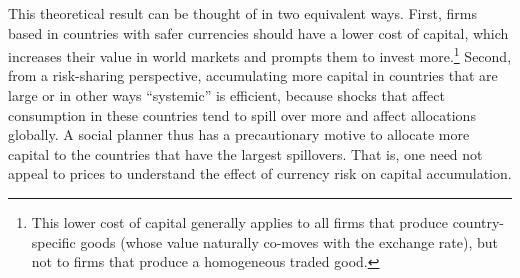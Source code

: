 \documentclass{ar-1col}
\begin{document}
This theoretical result can be thought of in two equivalent ways. First, firms based in countries with safer currencies should have a lower cost of capital, which increases their value in world markets and prompts them to invest more.\footnote{This lower cost of capital generally applies to all firms that produce country-specific goods (whose value naturally co-moves with the exchange rate), but not to firms that produce a homogeneous traded good.} Second, from a risk-sharing perspective, accumulating more capital in countries that are large or in other ways ``systemic'' is efficient, because shocks that affect consumption in these countries tend to spill over more and affect allocations globally. A social planner thus has a precautionary motive to allocate more capital to the countries that have the largest spillovers. That is, one need not appeal to prices to understand the effect of currency risk on capital accumulation.

\end{document}

